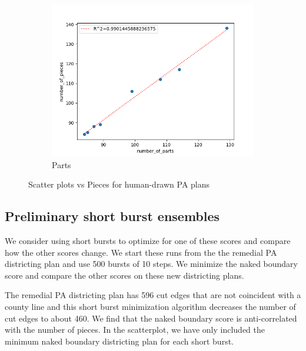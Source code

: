 \documentclass{mgggarticle}
\begin{document}
\begin{figure}
\begin{subfigure}{0.4\textwidth}
\centering
\includegraphics[width=\textwidth]{scatters/parts.png}
\caption{Parts}
\end{subfigure}
\caption{Scatter plots vs Pieces for human-drawn PA plans}
\end{figure}

\subsection{Preliminary short burst ensembles}
We consider using short bursts to optimize for one of these scores and compare how the other scores change. We start these runs from the the remedial PA districting plan and use 500 bursts of 10 steps. We minimize the naked boundary score and compare the other scores on these new districting plans. 

The remedial PA districting plan has 596 cut edges that are not coincident with a county line and this short burst minimization algorithm decreases the number of cut edges to about 460. We find that the naked boundary score is anti-correlated with the number of pieces. In the scatterplot, we have only included the minimum naked boundary districting plan for each short burst.
\end{document}
